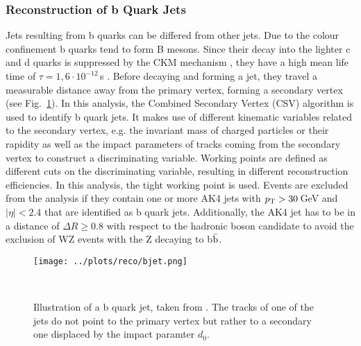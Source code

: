 \subsubsection*{Reconstruction of b Quark Jets}
Jets resulting from b quarks can be differed from other jets. Due to the colour confinement b quarks tend to form B mesons. Since their decay into the lighter c and d quarks is suppressed by the CKM mechanism \cite{CKM}, they have a high mean life time of $\tau=1,6\cdot 10^{-12}$\,s \cite{SMmasses}. Before decaying and forming a jet, they travel a measurable distance away from the primary vertex, forming a secondary vertex (see Fig.~\ref{fig:reco:bjet}). In this analysis, the Combined Secondary Vertex (CSV) algorithm \cite{CSV} is used to identify b quark jets. It makes use of different kinematic variables related to the secondary vertex, e.g. the invariant mass of charged particles or their rapidity as well as the impact parameters of tracks coming from the secondary vertex to construct a discriminating variable. Working points are defined as different cuts on the discriminating variable, resulting in different reconstruction efficiencies. In this analysis, the tight working point is used. Events are excluded from the analysis if they contain one or more AK4 jets with $p_{\rm T}>30$\,GeV and $|\eta|<2.4$ that are identified as b quark jets. Additionally, the AK4 jet has to be in a distance of $\Delta R \geq 0.8$ with respect to the hadronic boson candidate to avoid the exclusion of WZ events with the Z decaying to b$\bar{\rm b}$.
\begin{figure}
    \centering
    \texttt{[image: ../plots/reco/bjet.png]}
    \caption[Illustration of a b quark jet]{Illustration of a b quark jet, taken from \cite{bjet}. The tracks of one of the jets do not point to the primary vertex but rather to a secondary one displaced by the impact paramter $d_0$.}\
    \label{fig:reco:bjet}
\end{figure}


